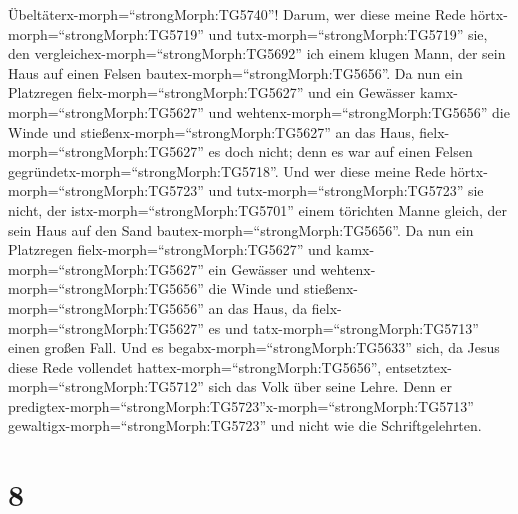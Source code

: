 Übeltäterx-morph=``strongMorph:TG5740''!  Darum, wer diese
meine Rede hörtx-morph=``strongMorph:TG5719'' und
tutx-morph=``strongMorph:TG5719'' sie, den
vergleichex-morph=``strongMorph:TG5692'' ich einem klugen Mann, der sein
Haus auf einen Felsen bautex-morph=``strongMorph:TG5656''. 
Da nun ein Platzregen fielx-morph=``strongMorph:TG5627'' und ein
Gewässer kamx-morph=``strongMorph:TG5627'' und
wehtenx-morph=``strongMorph:TG5656'' die Winde und
stießenx-morph=``strongMorph:TG5627'' an das Haus,
fielx-morph=``strongMorph:TG5627'' es doch nicht; denn es war auf einen
Felsen gegründetx-morph=``strongMorph:TG5718''.  Und wer
diese meine Rede hörtx-morph=``strongMorph:TG5723'' und
tutx-morph=``strongMorph:TG5723'' sie nicht, der
istx-morph=``strongMorph:TG5701'' einem törichten Manne gleich, der sein
Haus auf den Sand bautex-morph=``strongMorph:TG5656''.  Da
nun ein Platzregen fielx-morph=``strongMorph:TG5627'' und
kamx-morph=``strongMorph:TG5627'' ein Gewässer und
wehtenx-morph=``strongMorph:TG5656'' die Winde und
stießenx-morph=``strongMorph:TG5656'' an das Haus, da
fielx-morph=``strongMorph:TG5627'' es und
tatx-morph=``strongMorph:TG5713'' einen großen Fall.  Und
es begabx-morph=``strongMorph:TG5633'' sich, da Jesus diese Rede
vollendet hattex-morph=``strongMorph:TG5656'',
entsetztex-morph=``strongMorph:TG5712'' sich das Volk über seine Lehre.
 Denn er
predigtex-morph=``strongMorph:TG5723''x-morph=``strongMorph:TG5713''
gewaltigx-morph=``strongMorph:TG5723'' und nicht wie die
Schriftgelehrten.

\hypertarget{section-7}{%
\section{8}\label{section-7}}

